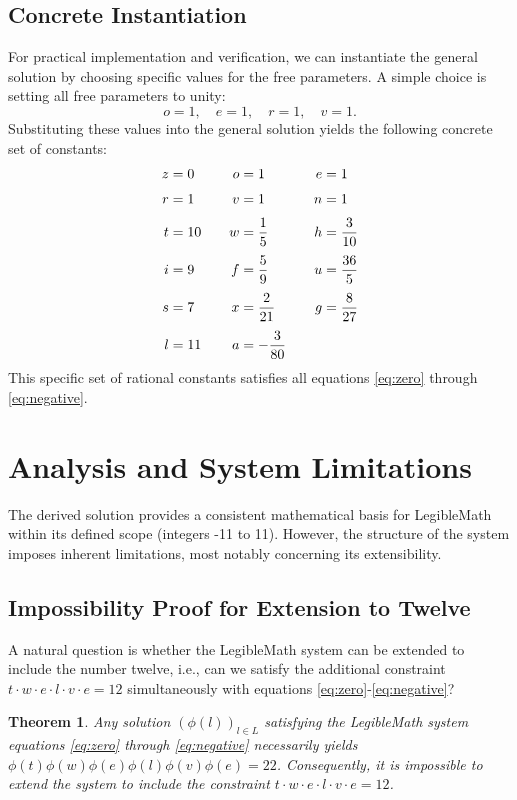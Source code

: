\documentclass[12pt,a4paper]{article}
\theoremstyle{plain}
\newtheorem{theorem}{Theorem}[section]
\theoremstyle{definition}
\begin{document}
\subsection{Concrete Instantiation}
For practical implementation and verification, we can instantiate the general solution by choosing specific values for the free parameters. A simple choice is setting all free parameters to unity:
\[ o = 1, \quad e = 1, \quad r = 1, \quad v = 1. \]
Substituting these values into the general solution yields the following concrete set of constants:
\[
\begin{alignedat}{3}
 z &= 0 & \qquad o &= 1 & \qquad e &= 1 \\[\jot]
 r &= 1 & \qquad v &= 1 & \qquad n &= 1 \\[\jot]
 t &= 10 & \qquad w &= \dfrac{1}{5} & \qquad h &= \dfrac{3}{10} \\[\jot]
 i &= 9 & \qquad f &= \dfrac{5}{9} & \qquad u &= \dfrac{36}{5} \\[\jot]
 s &= 7 & \qquad x &= \dfrac{2}{21} & \qquad g &= \dfrac{8}{27} \\[\jot]
 l &= 11 & \qquad a &= -\dfrac{3}{80} & & %
\end{alignedat}
\]
This specific set of rational constants satisfies all equations \eqref{eq:zero} through \eqref{eq:negative}.

\section{Analysis and System Limitations}
\label{sec:analysis}

The derived solution provides a consistent mathematical basis for LegibleMath within its defined scope (integers -11 to 11). However, the structure of the system imposes inherent limitations, most notably concerning its extensibility.

\subsection{Impossibility Proof for Extension to Twelve}
A natural question is whether the LegibleMath system can be extended to include the number twelve, i.e., can we satisfy the additional constraint $t \cdot w \cdot e \cdot l \cdot v \cdot e = 12$ simultaneously with equations \eqref{eq:zero}-\eqref{eq:negative}?

\begin{theorem}
\label{thm:twelve}
Any solution $(\phi(l))_{l \in L}$ satisfying the LegibleMath system equations \eqref{eq:zero} through \eqref{eq:negative} necessarily yields $\phi(t)\phi(w)\phi(e)\phi(l)\phi(v)\phi(e) = 22$. Consequently, it is impossible to extend the system to include the constraint $t \cdot w \cdot e \cdot l \cdot v \cdot e = 12$.
\end{theorem}
\end{document}
